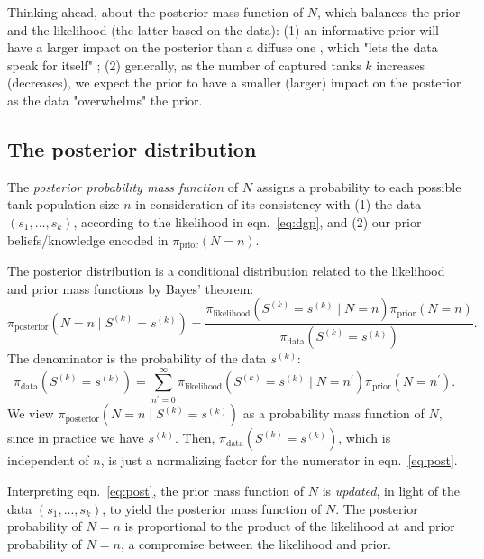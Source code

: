 \documentclass[11pt, oneside]{article}
\newcommand{\data}{$(s_1, ..., s_k)$\xspace}
\begin{document}
Thinking ahead, about the posterior mass function of $N$, which balances the prior and the likelihood (the latter based on the data): 
(1) an informative prior will have a larger impact on the posterior than a diffuse one \cite{van2021bayesian}, which "lets the data speak for itself" \cite{downey2021think};
(2) generally, as the number of captured tanks $k$ increases (decreases), we expect the prior to have a smaller (larger) impact on the posterior \cite{downey2021think} as the data "overwhelms" the prior.

\subsection{The posterior distribution}
\label{sec:posterior}
The \emph{posterior probability mass function} of $N$ assigns a probability to each possible tank population size $n$ in consideration of its consistency with (1) the data \data, according to the likelihood in eqn.~\ref{eq:dgp}, and (2) our prior beliefs/knowledge encoded in $\pi_{\text{prior}}(N=n)$. 

The posterior distribution is a conditional distribution related to the likelihood and prior mass functions by Bayes' theorem:
\begin{equation}
	\pi_{\text{posterior}}(N=n \mid S^{(k)}=s^{(k)}) = 
	\frac{\pi_{\text{likelihood}}(S^{(k)}=s^{(k)} \mid N=n) \pi_{\text{prior}}(N=n)}{\pi_{\text{data}}(S^{(k)}=s^{(k)})}. \label{eq:post}
\end{equation} 
The denominator is the probability of the data $s^{(k)}$:
\begin{equation}
	\pi_{\text{data}}(S^{(k)}=s^{(k)})= \displaystyle \sum_{n^\prime=0}^\infty \pi_{\text{likelihood}}(S^{(k)}=s^{(k)} \mid N=n^\prime) \pi_{\text{prior}}(N=n^\prime). \label{eq:prob_data}
\end{equation}
We view $\pi_{\text{posterior}}(N=n \mid S^{(k)}=s^{(k)})$ as a probability mass function of $N$, since in practice we have $s^{(k)}$. 
Then, $\pi_{\text{data}}(S^{(k)}=s^{(k)})$, which is independent of $n$, is just a normalizing factor for the numerator in eqn.~\ref{eq:post}. 

Interpreting eqn.~\ref{eq:post}, the prior mass function of $N$ is \emph{updated}, in light of the data \data, to yield the posterior mass function of $N$. The posterior probability of $N=n$ is proportional to the product of the likelihood at and prior probability of $N=n$, a compromise between the likelihood and prior.
\end{document}
